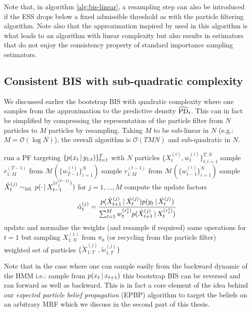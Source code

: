 Note that, in algorithm \ref{alg:bis-linear}, a resampling step can also be introduced if the ESS drops below a fixed admissible threshold as with the particle filtering algorithm. 
Note also that the approximation inspired by \citet{briers05} used in this algorithm is what leads to an algorithm with linear complexity but also results in estimators that do not enjoy the consistency property of standard importance sampling estimators.

\subsection{Consistent BIS with sub-quadratic complexity}
%
We discussed earlier the bootstrap BIS with quadratic complexity where one samples from the approximation to the predictive density $\widehat{\text{PD}}_{t}$.
This can in fact be simplified by compressing the representation of the particle filter from $N$ particles to $M$ particles by resampling. Taking $M$ to be sub-linear in $N$ (e.g.: $M=\mathcal O(\log N)$), the overall algorithm is $\mathcal O(TMN)$ and sub-quadratic in $N$.

%
\begin{algorithm}[!h]\small
	\caption{\label{alg:bis-sublin}}
	\begin{algorithmic}[1]
		\State run a PF targeting $\{p(x_{t}\,|\, y_{1:t})\}_{t=1}^{T}$ with $N$ particles $\{X^{(i)}_{t}, w^{(i)}_{t}\}_{t,i=1}^{T,N}$
		\State sample $r^{(T-1)}_{1:M}$ from $\mathcal M(\{w^{(i)}_{T-1}\}_{i=1}^{N})$ 
			\State sample $r^{(t-1)}_{1:M}$ from $\mathcal M(\{w^{(i)}_{t-1}\}_{i=1}^{N})$ 
			\State sample $\tilde X^{(j)}_{t}\sim_{\mathrm{iid.}} p(\cdot\,|\, X^{(r^{(t-1)}_{j})}_{t-1})$  for $j=1,\dots,M$
			\State compute the update factors $$\tilde \alpha^{(j)}_{t} = {p(\tilde X^{(j)}_{t+1}\,|\, \tilde X^{(j)}_{t})p(y_{t}\,|\, \tilde X^{(j)}_{t})\over \sum_{\ell=1}^{M} w^{(r^{t}_{\ell})}_{t} p(\tilde X^{(j)}_{t+1} \,|\, X^{(r^{t}_{\ell})}_{t})  }$$
			\State update and normalise the weights (and resample if required)
		\EndFor
		\State same operations for $t=1$ but sampling $X^{(1)}_{1:N}$ from $\pi_{0}$ (or recycling from the particle filter)\\
		\Return weighted set of particles $\{\tilde X^{(j)}_{1:T}, \tilde w^{(j)}_{1:T}\}$
	\end{algorithmic}
\end{algorithm}
%

Note that in the case where one can sample easily from the backward dynamic of the HMM i.e.: sample from $p(x_{t}\,|\, x_{t+1})$ this bootstrap BIS can be reversed and ran forward as well as backward. 
This is in fact a core element of the idea behind our \emph{expected particle belief propagation} (EPBP) algorithm \citep{lienart15} to target the beliefs on an arbitrary MRF which we discuss in the second part of this thesis.

